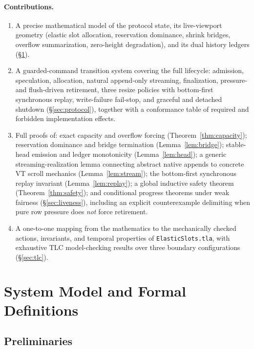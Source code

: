 \documentclass[11pt]{article}
\theoremstyle{definition}
\theoremstyle{remark}
\begin{document}
\paragraph{Contributions.}
\begin{enumerate}
\item A precise mathematical model of the protocol state, its live-viewport
  geometry (elastic slot allocation, reservation dominance, shrink bridges,
  overflow summarization, zero-height degradation), and its dual history
  ledgers (\S\ref{sec:model}).
\item A guarded-command transition system covering the full lifecycle:
  admission, speculation, allocation, natural append-only streaming,
  finalization, pressure- and flush-driven retirement, three resize policies
  with bottom-first synchronous replay, write-failure fail-stop, and graceful
  and detached shutdown (\S\ref{sec:protocol}), together with a conformance
  table of required and forbidden implementation effects.
\item Full proofs of: exact capacity and overflow forcing
  (Theorem~\ref{thm:capacity}); reservation dominance and bridge termination
  (Lemma~\ref{lem:bridge}); stable-head emission and ledger monotonicity
  (Lemma~\ref{lem:head}); a generic streaming-realization lemma connecting
  abstract native appends to concrete VT scroll mechanics
  (Lemma~\ref{lem:stream}); the bottom-first synchronous replay invariant
  (Lemma~\ref{lem:replay}); a global inductive safety theorem
  (Theorem~\ref{thm:safety}); and conditional progress theorems under weak
  fairness (\S\ref{sec:liveness}), including an explicit counterexample
  delimiting when pure row pressure does \emph{not} force retirement.
\item A one-to-one mapping from the mathematics to the mechanically checked
  actions, invariants, and temporal properties of \texttt{ElasticSlots.tla},
  with exhaustive TLC model-checking results over three boundary
  configurations (\S\ref{sec:tlc}).
\end{enumerate}

\section{System Model and Formal Definitions}\label{sec:model}

\subsection{Preliminaries}
\end{document}

